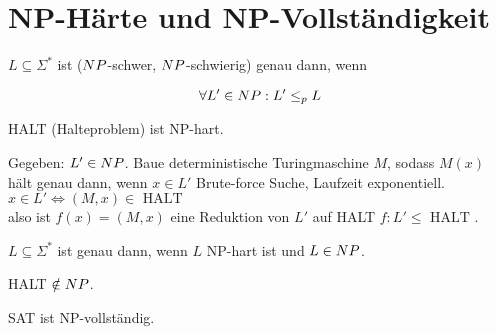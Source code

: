 \section{NP-Härte und NP-Vollständigkeit}


\begin{definition}
    
    $L \subseteq \Sigma^\ast$ ist  ($NP$-schwer, $NP$-schwierig) genau dann, wenn 

    $$ \forall L' \in NP: L' \leq_p L $$

\end{definition}


\begin{satz}
    HALT (Halteproblem) ist NP-hart.
\end{satz}
\begin{beweis}
    Gegeben: $L' \in NP$. Baue deterministische Turingmaschine $M$, sodass $M(x)$ hält genau dann, wenn $x \in L'$ Brute-force Suche, Laufzeit exponentiell.\\
    $x \in L' \Leftrightarrow (M, x) \in \text{ HALT } $\\
    also ist $f(x) = (M,x)$ eine Reduktion von $L'$ auf HALT $f: L' \leq \text{ HALT }$.
\end{beweis}



\begin{definition}

    $L \subseteq \Sigma^\ast$ ist  genau dann, wenn $L$ NP-hart ist und $L \in NP$.

\end{definition}


\begin{satz}
    HALT $\notin NP$.
\end{satz}



\begin{satz}

    SAT ist NP-vollständig.
\end{satz}

